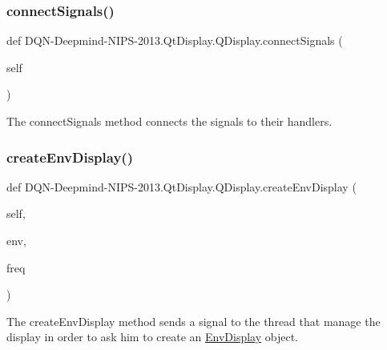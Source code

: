 \subsubsection{\texorpdfstring{connect\+Signals()}{connectSignals()}}
{\footnotesize\ttfamily def D\+QN-\/Deepmind-\/N\+I\+PS-\/2013.Qt\+Display.\+Q\+Display.\+connect\+Signals (\begin{DoxyParamCaption}\item[{}]{self }\end{DoxyParamCaption})}



The connect\+Signals method connects the signals to their handlers. 

\hypertarget{classDQN-Deepmind-NIPS-2013_1_1QtDisplay_1_1QDisplay_af84de3d09bc8fc27f09f5e6a3c4775a1}{}\label{classDQN-Deepmind-NIPS-2013_1_1QtDisplay_1_1QDisplay_af84de3d09bc8fc27f09f5e6a3c4775a1} 
\subsubsection{\texorpdfstring{create\+Env\+Display()}{createEnvDisplay()}}
{\footnotesize\ttfamily def D\+QN-\/Deepmind-\/N\+I\+PS-\/2013.Qt\+Display.\+Q\+Display.\+create\+Env\+Display (\begin{DoxyParamCaption}\item[{}]{self,  }\item[{}]{env,  }\item[{}]{freq }\end{DoxyParamCaption})}



The create\+Env\+Display method sends a signal to the thread that manage the display in order to ask him to create an \hyperlink{namespaceDQN-Deepmind-NIPS-2013_1_1EnvDisplay}{Env\+Display} object. 

\hypertarget{classDQN-Deepmind-NIPS-2013_1_1QtDisplay_1_1QDisplay_adf1649fb26b3af16c155db2adf1275d2}{}\label{classDQN-Deepmind-NIPS-2013_1_1QtDisplay_1_1QDisplay_adf1649fb26b3af16c155db2adf1275d2} 
